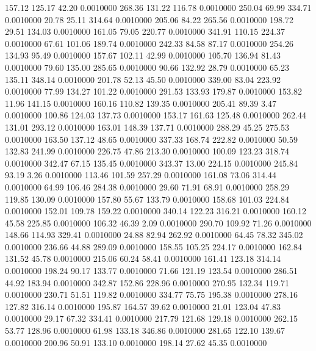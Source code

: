  157.12  125.17   42.20   0.0010000
 268.36  131.22  116.78   0.0010000
 250.04   69.99  334.71   0.0010000
  20.78   25.11  314.64   0.0010000
 205.06   84.22  265.56   0.0010000
 198.72   29.51  134.03   0.0010000
 161.05   79.05  220.77   0.0010000
 341.91  110.15  224.37   0.0010000
  67.61  101.06  189.74   0.0010000
 242.33   84.58   87.17   0.0010000
 254.26  134.93   95.49   0.0010000
 157.67  102.11   42.99   0.0010000
 105.70  136.94   81.43   0.0010000
  79.60  135.00  285.65   0.0010000
  90.66  132.92   28.79   0.0010000
  65.23  135.11  348.14   0.0010000
 201.78   52.13   45.50   0.0010000
 339.00   83.04  223.92   0.0010000
  77.99  134.27  101.22   0.0010000
 291.53  133.93  179.87   0.0010000
 153.82   11.96  141.15   0.0010000
 160.16  110.82  139.35   0.0010000
 205.41   89.39    3.47   0.0010000
 100.86  124.03  137.73   0.0010000
 153.17  161.63  125.48   0.0010000
 262.44  131.01  293.12   0.0010000
 163.01  148.39  137.71   0.0010000
 288.29   45.25  275.53   0.0010000
 163.50  137.12   48.65   0.0010000
 337.33  168.74  222.82   0.0010000
  50.59  132.83  241.99   0.0010000
 226.75   47.86  213.30   0.0010000
 100.09  123.23  318.74   0.0010000
 342.47   67.15  135.45   0.0010000
 343.37   13.00  224.15   0.0010000
 245.84   93.19    3.26   0.0010000
 113.46  101.59  257.29   0.0010000
 161.08   73.06  314.44   0.0010000
  64.99  106.46  284.38   0.0010000
  29.60   71.91   68.91   0.0010000
 258.29  119.85  130.09   0.0010000
 157.80   55.67  133.79   0.0010000
 158.68  101.03  224.84   0.0010000
 152.01  109.78  159.22   0.0010000
 340.14  122.23  316.21   0.0010000
 160.12   45.58  225.85   0.0010000
 106.32   46.39    2.09   0.0010000
 290.70  109.92   71.26   0.0010000
 148.66  114.93  329.41   0.0010000
  24.88   82.94  262.92   0.0010000
  64.45   78.32  345.02   0.0010000
 236.66   44.88  289.09   0.0010000
 158.55  105.25  224.17   0.0010000
 162.84  131.52   45.78   0.0010000
 215.06   60.24   58.41   0.0010000
 161.41  123.18  314.14   0.0010000
 198.24   90.17  133.77   0.0010000
  71.66  121.19  123.54   0.0010000
 286.51   44.92  183.94   0.0010000
 342.87  152.86  228.96   0.0010000
 270.95  132.34  119.71   0.0010000
 230.71   51.51  119.82   0.0010000
 334.77   75.75  195.38   0.0010000
 278.16  127.82  316.14   0.0010000
 195.87  164.57   39.62   0.0010000
  21.01  123.04   47.83   0.0010000
  29.17   67.32  334.41   0.0010000
 217.79  121.68  129.18   0.0010000
 262.15   53.77  128.96   0.0010000
  61.98  133.18  346.86   0.0010000
 281.65  122.10  139.67   0.0010000
 200.96   50.91  133.10   0.0010000
 198.14   27.62   45.35   0.0010000
